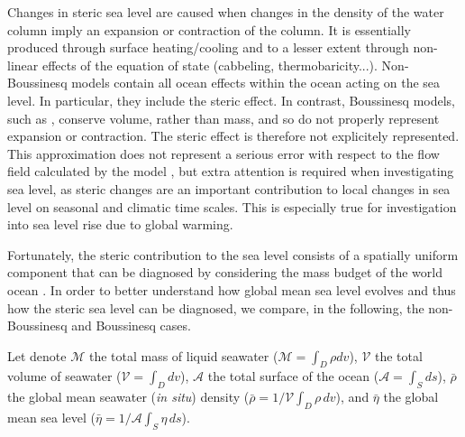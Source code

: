 Changes in steric sea level are caused when changes in the density of the water 
column imply an expansion or contraction of the column. It is essentially produced 
through surface heating/cooling and to a lesser extent through non-linear effects of 
the equation of state (cabbeling, thermobaricity...).
Non-Boussinesq models contain all ocean effects within the ocean acting 
on the sea level. In particular, they include the steric effect. In contrast, 
Boussinesq models, such as \NEMO, conserve volume, rather than mass, 
and so do not properly represent expansion or contraction. The steric effect is 
therefore not explicitely represented.
This approximation does not represent a serious error with respect to the flow field 
calculated by the model \citep{Greatbatch_JGR94}, but extra attention is required
when investigating sea level, as steric changes are an important 
contribution to local changes in sea level on seasonal and climatic time scales.
This is especially true for investigation into sea level rise due to global warming. 

Fortunately, the steric contribution to the sea level consists of a spatially uniform 
component that can be diagnosed by considering the mass budget of the world 
ocean \citep{Greatbatch_JGR94}. 
In order to better understand how global mean sea level evolves and thus how
the steric sea level can be diagnosed, we compare, in the following, the 
non-Boussinesq and Boussinesq cases.

Let denote 
$\mathcal{M}$ the total mass of liquid seawater ($\mathcal{M}=\int_D \rho dv$), 
$\mathcal{V}$ the total volume of seawater ($\mathcal{V}=\int_D dv$), 
$\mathcal{A}$ the total surface of the ocean ($\mathcal{A}=\int_S ds$), 
$\bar{\rho}$ the global mean seawater (\textit{in situ}) density ($\bar{\rho}= 1/\mathcal{V} \int_D \rho \,dv$), and
$\bar{\eta}$ the global mean sea level ($\bar{\eta}=1/\mathcal{A}\int_S \eta \,ds$).

